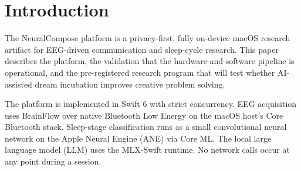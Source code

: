 \section{Introduction}
\label{sec:intro}

%
%
%
%
%

The NeuralCompose platform is a privacy-first, fully on-device macOS
research artifact for EEG-driven communication and sleep-cycle research.
This paper describes the platform, the validation that the
hardware-and-software pipeline is operational, and the pre-registered
research program that will test whether AI-assisted dream incubation
improves creative problem solving.

The platform is implemented in Swift 6 with strict concurrency. EEG
acquisition uses BrainFlow \citep{brainflow2022} over native Bluetooth Low
Energy on the macOS host's Core Bluetooth stack. Sleep-stage classification
runs as a small convolutional neural network on the Apple Neural Engine
(ANE) via Core ML. The local large language model (LLM) uses the MLX-Swift
runtime. No network calls occur at any point during a session.

